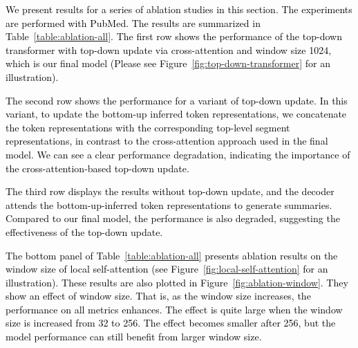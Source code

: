 \documentclass{article} \usepackage{iclr2022_conference,times}
\begin{document}
\textcolor{black}{
We present results for a series of ablation studies in this section. The experiments are performed with PubMed. The results are summarized in Table~\ref{table:ablation-all}. The first row shows the performance of the top-down transformer with top-down update via cross-attention and window size 1024, which is our final model (Please see Figure~\ref{fig:top-down-transformer} for an illustration). 
}

\textcolor{black}{
The second row shows the performance for a variant of top-down update. In this variant, to update the bottom-up inferred token representations, we concatenate the token representations with the corresponding top-level segment representations, in contrast to the cross-attention approach used in the final model. We can see a clear performance degradation, indicating the importance of the cross-attention-based top-down update. 
}

\textcolor{black}{
The third row displays the results without top-down update, and the decoder attends the bottom-up-inferred token representations to generate summaries. Compared to our final model, the performance is also degraded, suggesting the effectiveness of the top-down update. 
}

\textcolor{black}{
The bottom panel of Table~\ref{table:ablation-all} presents ablation results on the window size of local self-attention (see Figure~\ref{fig:local-self-attention} for an illustration). These results are also plotted in Figure~\ref{fig:ablation-window}. They show an effect of window size. That is, as the window size increases, the performance on all metrics enhances. The effect is quite large when the window size is increased from 32 to 256. The effect becomes smaller after 256, but the model performance can still benefit from larger window size. 
}
\end{document}
